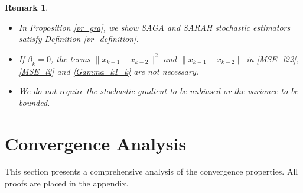 \documentclass[letterpaper]{article} %
\newtheorem{remark}{Remark}
\begin{document}
	\begin{remark}
		\begin{itemize}
			\item In Proposition \ref{vr_gra}, we show   SAGA and SARAH stochastic estimators satisfy Definition \ref{vr_definition}. %
			\item If $\beta_{k}=0$,   the terms $\|x_{k-1}-x_{k-2}\|^{2}$ and $\|x_{k-1}-x_{k-2}\|$ in \eqref{MSE_l22}, \eqref{MSE_l2} and \eqref{Gamma_k1_k} are not necessary.
			\item We do not require the stochastic gradient to be unbiased or the variance to be bounded.
		\end{itemize}
	\end{remark}


	\section{Convergence Analysis}\label{convergence_analysis}
	This section presents a comprehensive analysis of the convergence properties. %
	All proofs are placed in the appendix.

\end{document}
